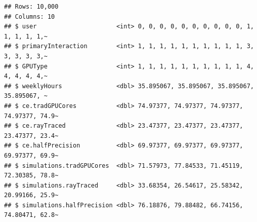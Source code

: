 \documentclass[
]{article}
\begin{document}
\begin{verbatim}
## Rows: 10,000
## Columns: 10
## $ user                      <int> 0, 0, 0, 0, 0, 0, 0, 0, 0, 0, 1, 1, 1, 1, 1,~
## $ primaryInteraction        <int> 1, 1, 1, 1, 1, 1, 1, 1, 1, 1, 3, 3, 3, 3, 3,~
## $ GPUType                   <int> 1, 1, 1, 1, 1, 1, 1, 1, 1, 1, 4, 4, 4, 4, 4,~
## $ weeklyHours               <dbl> 35.895067, 35.895067, 35.895067, 35.895067, ~
## $ ce.tradGPUCores           <dbl> 74.97377, 74.97377, 74.97377, 74.97377, 74.9~
## $ ce.rayTraced              <dbl> 23.47377, 23.47377, 23.47377, 23.47377, 23.4~
## $ ce.halfPrecision          <dbl> 69.97377, 69.97377, 69.97377, 69.97377, 69.9~
## $ simulations.tradGPUCores  <dbl> 71.57973, 77.84533, 71.45119, 72.30385, 78.8~
## $ simulations.rayTraced     <dbl> 33.68354, 26.54617, 25.58342, 20.99166, 25.9~
## $ simulations.halfPrecision <dbl> 76.18876, 79.88482, 66.74156, 74.80471, 62.8~
\end{verbatim}
\end{document}
